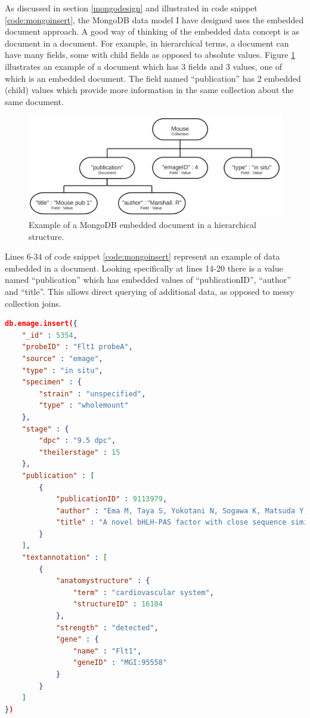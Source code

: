 As discussed in section \ref{mongodesign} and illustrated in code snippet \ref{code:mongoinsert}, the MongoDB data model I have designed uses the embedded document approach. A good way of thinking of the embedded data concept is as document in a document. For example, in hierarchical terms, a document can have many fields, some with child fields as opposed to absolute values. Figure \ref{fig:embedded} illustrates an example of a document which has 3 fields and 3 values, one of which is an embedded document. The field named ``publication'' has 2 embedded (child) values which provide more information in the same collection about the same document.\begin{figure}[H]\begin{center}\includegraphics[width=1\linewidth]{images/embeddedex}\caption{Example of a MongoDB embedded document in a hierarchical structure.}\label{fig:embedded}\end{center}\end{figure}
\parindent 0pt
Lines 6-34 of code snippet \ref{code:mongoinsert} represent an example of data embedded in a document. Looking specifically at lines 14-20 there is a value named ``publication'' which has embedded values of ``publicationID'', ``author'' and ``title''. This allows direct querying of additional data, as opposed to messy collection joins.
\parindent 15pt
\newpage
\begin{lstlisting}[language=json,caption=Example insertion of data into a MongoDB document., label=code:mongoinsert]
db.emage.insert({
    "_id" : 5354,
    "probeID" : "Flt1 probeA",
    "source" : "emage",
    "type" : "in situ",
    "specimen" : {
        "strain" : "unspecified",
        "type" : "wholemount"
    },
    "stage" : {
        "dpc" : "9.5 dpc",
        "theilerstage" : 15
    },
    "publication" : [ 
        {
            "publicationID" : 9113979,
            "author" : "Ema M, Taya S, Yokotani N, Sogawa K, Matsuda Y, Fujii-Kuriyama Y",
            "title" : "A novel bHLH-PAS factor with close sequence similarity to hypoxia-inducible factor 1alpha regulates the VEGF expression and is potentially involved in lung and vascular development."
        }
    ],
    "textannotation" : [ 
        {
            "anatomystructure" : {
                "term" : "cardiovascular system",
                "structureID" : 16104
            },
            "strength" : "detected",
            "gene" : {
                "name" : "Flt1",
                "geneID" : "MGI:95558"
            }
        }
    ]
})
\end{lstlisting} 


